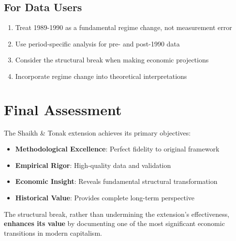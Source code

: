 \documentclass[12pt]{article}
\begin{document}
\subsection{For Data Users}

\begin{enumerate}
    \item Treat 1989-1990 as a fundamental regime change, not measurement error
    \item Use period-specific analysis for pre- and post-1990 data
    \item Consider the structural break when making economic projections
    \item Incorporate regime change into theoretical interpretations
\end{enumerate}

\section{Final Assessment}

\begin{tcolorbox}[colback=blue!5!white,colframe=blue!75!black,title=Overall Effectiveness Rating: EXCELLENT]
The Shaikh \& Tonak extension achieves its primary objectives:

\begin{itemize}
    \item \textbf{Methodological Excellence}: Perfect fidelity to original framework
    \item \textbf{Empirical Rigor}: High-quality data and validation
    \item \textbf{Economic Insight}: Reveals fundamental structural transformation
    \item \textbf{Historical Value}: Provides complete long-term perspective
\end{itemize}

The structural break, rather than undermining the extension's effectiveness, \textbf{enhances its value} by documenting one of the most significant economic transitions in modern capitalism.
\end{tcolorbox}
\end{document}
